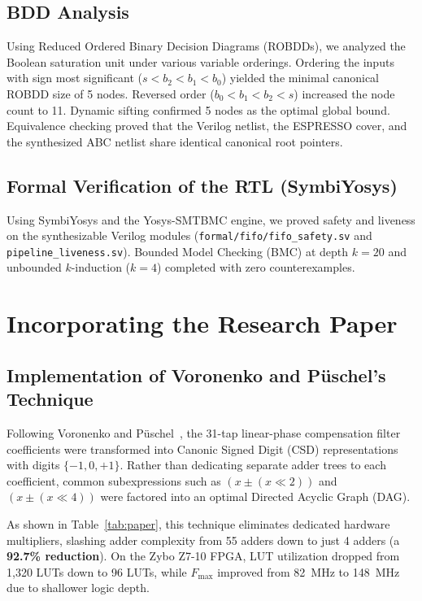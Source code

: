 \documentclass[11pt,a4paper]{article}
\begin{document}
\subsection{BDD Analysis}
Using Reduced Ordered Binary Decision Diagrams (ROBDDs), we analyzed the Boolean saturation unit under various variable orderings. Ordering the inputs with sign most significant ($s < b_2 < b_1 < b_0$) yielded the minimal canonical ROBDD size of 5 nodes. Reversed order ($b_0 < b_1 < b_2 < s$) increased the node count to 11. Dynamic sifting confirmed 5 nodes as the optimal global bound. Equivalence checking proved that the Verilog netlist, the ESPRESSO cover, and the synthesized ABC netlist share identical canonical root pointers.

\subsection{Formal Verification of the RTL (SymbiYosys)}
Using SymbiYosys and the Yosys-SMTBMC engine, we proved safety and liveness on the synthesizable Verilog modules (\texttt{formal/fifo/fifo_safety.sv} and \texttt{pipeline_liveness.sv}). Bounded Model Checking (BMC) at depth $k=20$ and unbounded $k$-induction ($k=4$) completed with zero counterexamples.

\section{Incorporating the Research Paper}
\label{sec:paper}

\subsection{Implementation of Voronenko and P\"uschel's Technique}
Following Voronenko and P\"uschel~\cite{voronenko2007}, the 31-tap linear-phase compensation filter coefficients were transformed into Canonic Signed Digit (CSD) representations with digits $\{-1, 0, +1\}$. Rather than dedicating separate adder trees to each coefficient, common subexpressions such as $(x \pm (x \ll 2))$ and $(x \pm (x \ll 4))$ were factored into an optimal Directed Acyclic Graph (DAG). 

As shown in Table~\ref{tab:paper}, this technique eliminates dedicated hardware multipliers, slashing adder complexity from 55 adders down to just 4 adders (a \textbf{92.7\% reduction}). On the Zybo Z7-10 FPGA, LUT utilization dropped from 1,320 LUTs down to 96 LUTs, while $F_{\text{max}}$ improved from 82~MHz to 148~MHz due to shallower logic depth.
\end{document}
